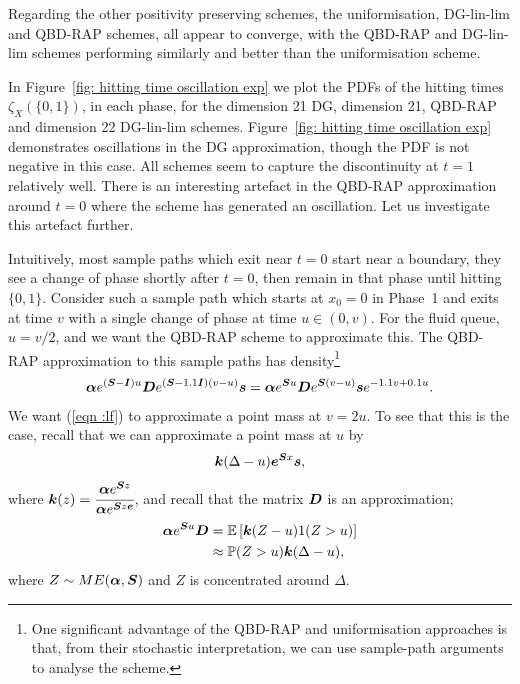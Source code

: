 Regarding the other positivity preserving schemes, the uniformisation, DG-lin-lim and QBD-RAP schemes, all appear to converge, with the QBD-RAP and DG-lin-lim schemes performing similarly and better than the uniformisation scheme. 

In Figure~\ref{fig: hitting time oscillation exp} we plot the PDFs of the hitting times \(\zeta_X(\{0,1\})\), in each phase, for the dimension 21 DG, dimension 21, QBD-RAP and dimension 22 DG-lin-lim schemes. Figure~\ref{fig: hitting time oscillation exp} demonstrates oscillations in the DG approximation, though the PDF is not negative in this case. All schemes seem to capture the discontinuity at \(t=1\) relatively well. There is an interesting artefact in the QBD-RAP approximation around \(t=0\) where the scheme has generated an oscillation. Let us investigate this artefact further. 

Intuitively, most sample paths which exit near \(t=0\) start near a boundary, they see a change of phase shortly after \(t=0\), then remain in that phase until hitting \(\{0,1\}\). Consider such a sample path which starts at \(x_0=0\) in Phase~1 and exits at time \(v\) with a single change of phase at time \(u\in(0,v)\). For the fluid queue, \(u=v/2\), and we want the QBD-RAP scheme to approximate this. The QBD-RAP approximation to this sample paths has density\footnote{One significant advantage of the QBD-RAP and uniformisation approaches is that, from their stochastic interpretation, we can use sample-path arguments to analyse the scheme.} 
\begin{align}
	\boldsymbol \alpha e^{(\boldsymbol S - \boldsymbol I)u} \boldsymbol D e^{(\boldsymbol S - 1.1\boldsymbol I)(v-u)}\boldsymbol s = \boldsymbol \alpha e^{\boldsymbol Su} \boldsymbol D e^{\boldsymbol S(v-u)}\boldsymbol s e^{-1.1v+0.1u}.\label{eqn :lf}
\end{align}
We want (\ref{eqn :lf}) to approximate a point mass at \(v=2u\). To see that this is the case, recall that we can approximate a point mass at \(u\) by 
\begin{equation}\boldsymbol k(\Delta - u)\boldsymbol e^{\boldsymbol Sx}\boldsymbol s,\label{eqn:aafba}\end{equation}
where \(\boldsymbol k(z)=\cfrac{\boldsymbol \alpha e^{\boldsymbol Sz}}{\boldsymbol \alpha e^{\boldsymbol Sz\boldsymbol e}}\),
and recall that the matrix \(\boldsymbol D\) is an approximation; 
\begin{align}
	\boldsymbol \alpha e^{\boldsymbol Su}\boldsymbol D &= \mathbb E\left[\boldsymbol k(Z-u)1(Z>u)\right]\nonumber 
	\\&\approx\mathbb P(Z>u) \boldsymbol k(\Delta-u), \label{eqn: aegpb}
\end{align} where \(Z\sim ME(\boldsymbol \alpha,\boldsymbol S)\)
and \(Z\) is concentrated around \(\Delta\). 

